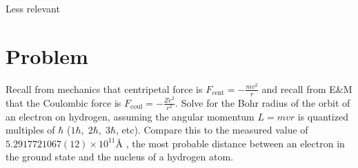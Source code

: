 \documentclass{report}
\begin{document}
\vspace{4cm}
{\huge Less relevant}

\section*{Problem}

Recall from mechanics that centripetal force is $F_{\text{cent}} = -\frac{mv^2}{r}$ and recall from E\&M that the Coulombic force is $F_{\text{coul}} = -\frac{Ze^2}{r^2}$. Solve for the Bohr radius of the orbit of an electron on hydrogen, assuming the angular momentum $L = mvr$ is quantized multiples of $\hbar$ ($1\hbar, \; 2\hbar,\; 3\hbar$, etc). Compare this to the measured value of $5.2917721067(12)\times10^{11} \text{\AA}$ , the most probable distance between an electron in the ground state and the nucleus of a hydrogen atom.
\end{document}
